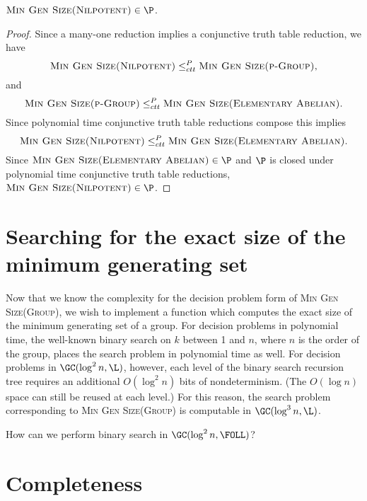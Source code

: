 \documentclass{article}
\begin{document}
\begin{theorem}
  $\textsc{Min Gen Size(Nilpotent)} \in \P$.
\end{theorem}
\begin{proof}
  Since a many-one reduction implies a conjunctive truth table reduction, we have
  \begin{equation*}
    \textsc{Min Gen Size(Nilpotent)} \leq_{ctt}^P \textsc{Min Gen Size(p-Group)},
  \end{equation*}
  and
  \begin{equation*}
    \textsc{Min Gen Size(p-Group)} \leq_{ctt}^P \textsc{Min Gen Size(Elementary Abelian)}.
  \end{equation*}
  Since polynomial time conjunctive truth table reductions compose this implies
  \begin{equation*}
    \textsc{Min Gen Size(Nilpotent)} \leq_{ctt}^P \textsc{Min Gen Size(Elementary Abelian)}.
  \end{equation*}
  Since $\textsc{Min Gen Size(Elementary Abelian)} \in \P$ and $\P$ is closed under polynomial time conjunctive truth table reductions, $\textsc{Min Gen Size(Nilpotent)} \in \P$.
\end{proof}

\section{Searching for the exact size of the minimum generating set}

Now that we know the complexity for the decision problem form of \textsc{Min Gen Size(Group)}, we wish to implement a function which computes the exact size of the minimum generating set of a group.
For decision problems in polynomial time, the well-known binary search on $k$ between 1 and $n$, where $n$ is the order of the group, places the search problem in polynomial time as well.
For decision problems in $\GC(\log^2 n, \L)$, however, each level of the binary search recursion tree requires an additional $O(\log^2 n)$ bits of nondeterminism.
(The $O(\log n)$ space can still be reused at each level.)
For this reason, the search problem corresponding to \textsc{Min Gen Size(Group)} is computable in $\GC(\log^3 n, \L)$.

\begin{todo}
  How can we perform binary search in $\GC(\log^2 n, \FOLL)$?
\end{todo}

\section{Completeness}
\end{document}
